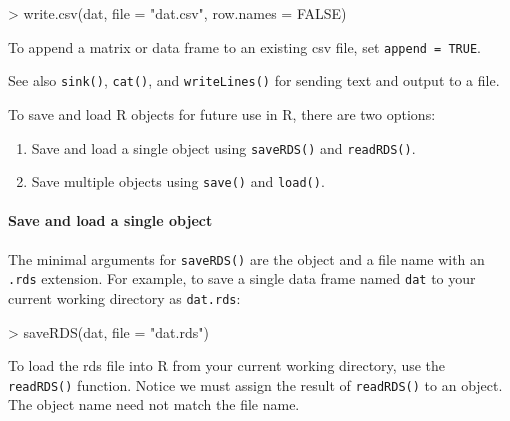 \documentclass[
]{book}
\newenvironment{Shaded}{\begin{snugshade}}{\end{snugshade}}
\newcommand{\AttributeTok}[1]{\textcolor[rgb]{0.77,0.63,0.00}{#1}}
\newcommand{\ConstantTok}[1]{\textcolor[rgb]{0.00,0.00,0.00}{#1}}
\newcommand{\FunctionTok}[1]{\textcolor[rgb]{0.00,0.00,0.00}{#1}}
\newcommand{\NormalTok}[1]{#1}
\newcommand{\SpecialCharTok}[1]{\textcolor[rgb]{0.00,0.00,0.00}{#1}}
\newcommand{\StringTok}[1]{\textcolor[rgb]{0.31,0.60,0.02}{#1}}
\providecommand{\tightlist}{%
  \setlength{\itemsep}{0pt}\setlength{\parskip}{0pt}}
\begin{document}
\begin{Shaded}
\begin{Highlighting}[]
\SpecialCharTok{\textgreater{}} \FunctionTok{write.csv}\NormalTok{(dat, }\AttributeTok{file =} \StringTok{"dat.csv"}\NormalTok{, }\AttributeTok{row.names =} \ConstantTok{FALSE}\NormalTok{)}
\end{Highlighting}
\end{Shaded}

To append a matrix or data frame to an existing csv file, set \texttt{append\ =\ TRUE}.

See also \texttt{sink()}, \texttt{cat()}, and \texttt{writeLines()} for sending text and output to a file.

To save and load R objects for future use in R, there are two options:

\begin{enumerate}
\def\labelenumi{\arabic{enumi}.}
\tightlist
\item
  Save and load a single object using \texttt{saveRDS()} and \texttt{readRDS()}.
\item
  Save multiple objects using \texttt{save()} and \texttt{load()}.
\end{enumerate}

\hypertarget{save-and-load-a-single-object}{%
\paragraph*{Save and load a single object}\label{save-and-load-a-single-object}}

The minimal arguments for \texttt{saveRDS()} are the object and a file name with an \texttt{.rds} extension. For example, to save a single data frame named \texttt{dat} to your current working directory as \texttt{dat.rds}:

\begin{Shaded}
\begin{Highlighting}[]
\SpecialCharTok{\textgreater{}} \FunctionTok{saveRDS}\NormalTok{(dat, }\AttributeTok{file =} \StringTok{"dat.rds"}\NormalTok{)}
\end{Highlighting}
\end{Shaded}

To load the rds file into R from your current working directory, use the \texttt{readRDS()} function. Notice we must assign the result of \texttt{readRDS()} to an object. The object name need not match the file name.
\end{document}
